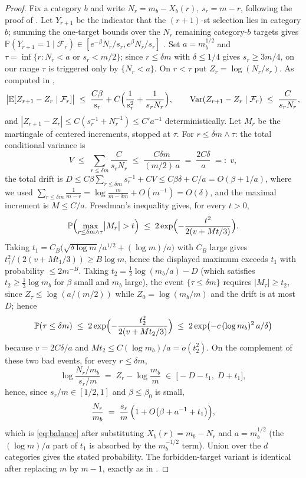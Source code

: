 \documentclass[11pt]{article}
\newcommand{\E}{\mathbb{E}}
\newcommand{\Prob}{\mathbb{P}}
\newcommand{\1}{\mathbf{1}}
\newcommand{\Var}{\mathrm{Var}}
\newcommand{\cF}{\mathcal{F}}
\theoremstyle{remark}
\begin{document}
\begin{proof}
Fix a category $b$ and write $N_r=m_b-X_b(r)$, $s_r=m-r$, following the proof
of \cite[Lemma~6.7]{Lon26}. Let $Y_{r+1}$ be the indicator that the
$(r+1)$-st selection lies in category $b$; summing the one-target bounds over
the $N_r$ remaining category-$b$ targets gives
$\Prob(Y_{r+1}=1\mid\cF_r)\in[e^{-\beta}N_r/s_r,e^{\beta}N_r/s_r]$
\cite[eq.~(6.6)]{Lon26}. Set $a=m_b^{1/2}$ and
$\tau=\inf\{r:N_r<a\text{ or }s_r<m/2\}$; since $r\le\delta m$ with
$\delta\le1/4$ gives $s_r\ge3m/4$, on our range $\tau$ is triggered only by
$\{N_r<a\}$. On $r<\tau$ put $Z_r=\log(N_r/s_r)$. As computed in
\cite[eq.~(6.7)]{Lon26},
\[
\bigl|\E[Z_{r+1}-Z_r\mid\cF_r]\bigr|
\;\le\;\frac{C\beta}{s_r}+C\Bigl(\frac{1}{s_r^2}+\frac{1}{s_rN_r}\Bigr),
\qquad
\Var(Z_{r+1}-Z_r\mid\cF_r)\;\le\;\frac{C}{s_rN_r},
\]
and $|Z_{r+1}-Z_r|\le C(s_r^{-1}+N_r^{-1})\le C'a^{-1}$ deterministically.
Let $M_r$ be the martingale of centered increments, stopped at $\tau$. For
$r\le\delta m\wedge\tau$: the total conditional variance is
\[
V\;\le\;\sum_{r\le\delta m}\frac{C}{s_rN_r}\;\le\;
\frac{C\delta m}{(m/2)\,a}\;=\;\frac{2C\delta}{a}\;=:\;v,
\]
the total drift is
$D\le C\beta\sum_{r\le\delta m}s_r^{-1}+CV\le C\beta\delta+C/a=O(\beta+1/a)$,
where we used
$\sum_{r\le\delta m}\frac1{m-r}=\log\frac{m}{m-\delta m}+O(m^{-1})=O(\delta)$,
and the maximal increment is $M\le C/a$. Freedman's inequality \cite{Fre75}
gives, for every $t>0$,
\[
\Prob\Bigl(\max_{r\le\delta m\wedge\tau}
\bigl|M_r\bigr|>t\Bigr)\;\le\;2\exp\Bigl(-\frac{t^2}{2(v+Mt/3)}\Bigr).
\]
Taking $t_1=C_B\bigl(\sqrt{\delta\log m}/a^{1/2}+(\log m)/a\bigr)$ with
$C_B$ large gives $t_1^2/(2(v+Mt_1/3))\ge B\log m$, hence the displayed
maximum exceeds $t_1$ with probability $\le2m^{-B}$. Taking
$t_2=\frac12\log(m_b/a)-D$ (which satisfies $t_2\ge\frac13\log m_b$ for
$\beta$ small and $m_b$ large), the event $\{\tau\le\delta m\}$ requires
$|M_\tau|\ge t_2$, since $Z_\tau\le\log(a/(m/2))$ while
$Z_0=\log(m_b/m)$ and the drift is at most $D$; hence
\[
\Prob(\tau\le\delta m)\;\le\;
2\exp\Bigl(-\frac{t_2^2}{2(v+Mt_2/3)}\Bigr)
\;\le\;2\exp\bigl(-c\,(\log m_b)^2\,a/\delta\bigr)
\]
because $v=2C\delta/a$ and $Mt_2\le C(\log m_b)/a=o(t_2^2)$.
On the complement of these two bad events, for every $r\le\delta m$,
\[
\log\frac{N_r/m_b}{s_r/m}\;=\;Z_r-\log\frac{m_b}{m}
\;\in\;\bigl[-D-t_1,\;D+t_1\bigr],
\]
hence, since $s_r/m\in[1/2,1]$ and $\beta\le\beta_0$ is small,
\[
\frac{N_r}{m_b}\;=\;\frac{s_r}{m}\,
\Bigl(1+O\bigl(\beta+a^{-1}+t_1\bigr)\Bigr),
\]
which is \eqref{eq:balance} after substituting
$X_b(r)=m_b-N_r$ and $a=m_b^{1/2}$ (the $(\log m)/a$ part of $t_1$ is
absorbed by the $m_b^{-1/2}$ term). Union over the $d$ categories gives the
stated probability. The forbidden-target variant is identical after replacing
$m$ by $m-1$, exactly as in \cite[Lemma~6.7]{Lon26}.
\end{proof}
\end{document}
